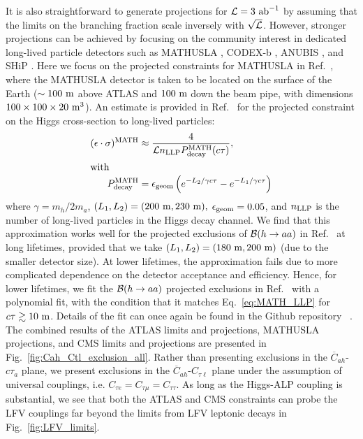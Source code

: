 It is also straightforward to generate projections for ${\cal L}=3~{\rm ab}^{-1}$ by assuming that the limits on the branching fraction scale inversely with $\sqrt{\cal L}$. However, stronger projections can be achieved by focusing on the community interest in dedicated long-lived particle detectors such as MATHUSLA \cite{Curtin:2018mvb,Lubatti:2019vkf,Alpigiani:2020tva,MATHUSLA:2025eth}, CODEX-b \cite{CODEX-b:2019jve}, ANUBIS \cite{Shah:2024fpl}, and SHiP \cite{SHiP:2021nfo}. Here we focus on the projected constraints for MATHUSLA in Ref.~\cite{Lubatti:2019vkf}, where the MATHUSLA detector is taken to be located on the surface of the Earth ($\sim100~{\rm m}$ above ATLAS and $100~{\rm m}$ down the beam pipe, with dimensions $100\times100\times20~{\rm m}^3$). An estimate is provided in Ref.~\cite{Curtin:2018mvb} for the projected constraint on the Higgs cross-section to long-lived particles:
\begin{align}
    (\epsilon \cdot \sigma)^{\rm MATH} &\approx \frac{4}{{\cal L} n_{\rm LLP} P^{\rm MATH}_{\rm decay}(c\tau)},\label{eq:MATH_LLP}\\
\intertext{with}
    P_{\rm decay}^{\rm MATH} &= \epsilon_{\rm geom}\left(e^{-L_2/\gamma c\tau} - e^{-L_1/\gamma c\tau}\right)
\end{align}
where $\gamma = m_h/2m_a$, $(L_1,L_2) = (200~{\rm m}, 230~{\rm m}),$ $\epsilon_{\rm geom} = 0.05$, and $n_{\rm LLP}$ is the number of long-lived particles in the Higgs decay channel. We find that this approximation works well for the projected exclusions of ${\cal B}(h\rightarrow aa)$ in Ref.~\cite{Curtin:2018mvb} at long lifetimes, provided that we take $(L_1, L_2) = (180~{\rm m},200~{\rm m})$ (due to the smaller detector size). At lower lifetimes, the approximation fails due to more complicated dependence on the detector acceptance and efficiency. Hence, for lower lifetimes, we fit the ${\cal B}(h\rightarrow aa)$ projected exclusions in Ref.~\cite{Curtin:2018mvb} with a polynomial fit, with the condition that it matches Eq.~\ref{eq:MATH_LLP} for $c\tau \gtrsim 10~{\rm m}$. Details of the fit can once again be found in the Github repository ~\cite{MarcarelliGithub2021}. The combined results of the ATLAS limits and projections, MATHUSLA projections, and CMS limits and projections are presented in Fig.~\ref{fig:Cah_Ctl_exclusion_all}. Rather than presenting exclusions in the $\overline{C}_{ah}$-$c\tau_a$ plane, we present exclusions in the $\overline{C}_{ah}$-$C_{\tau \ell}$ plane under the assumption of universal couplings, i.e. $C_{\tau e} = C_{\tau \mu} = C_{\tau\tau}$. As long as the Higgs-ALP coupling is substantial, we see that both the ATLAS and CMS constraints can probe the LFV couplings far beyond the limits from LFV leptonic decays in Fig.~\ref{fig:LFV_limits}. 

